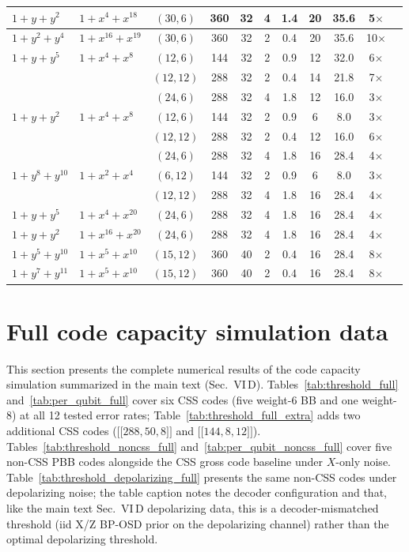\documentclass[aps,prxquantum,twocolumn,superscriptaddress,nofootinbib]{revtex4-2}
\newcommand{\dblbrk}[1]{\ensuremath{\lbrack\!\lbrack #1 \rbrack\!\rbrack}}
\newcommand{\code}[1]{\dblbrk{#1}}
\begin{document}
\begin{table}[t]
\begin{tabular}{llccccccccc}
\midrule
$1{+}y{+}y^{2}$ & $1{+}x^{4}{+}x^{18}$ & $(30,6)$ & 360 & 32 & 4 & 1.4 & 20 & 35.6 & 5$\times$ \\
\midrule
$1{+}y^{2}{+}y^{4}$ & $1{+}x^{16}{+}x^{19}$ & $(30,6)$ & 360 & 32 & 2 & 0.4 & 20 & 35.6 & 10$\times$ \\
\midrule
$1{+}y{+}y^{5}$ & $1{+}x^{4}{+}x^{8}$ & $(12,6)$ & 144 & 32 & 2 & 0.9 & 12 & 32.0 & 6$\times$ \\
 & & $(12,12)$ & 288 & 32 & 2 & 0.4 & 14 & 21.8 & 7$\times$ \\
 & & $(24,6)$ & 288 & 32 & 4 & 1.8 & 12 & 16.0 & 3$\times$ \\
\midrule
$1{+}y{+}y^{2}$ & $1{+}x^{4}{+}x^{8}$ & $(12,6)$ & 144 & 32 & 2 & 0.9 & 6 & 8.0 & 3$\times$ \\
 & & $(12,12)$ & 288 & 32 & 2 & 0.4 & 12 & 16.0 & 6$\times$ \\
 & & $(24,6)$ & 288 & 32 & 4 & 1.8 & 16 & 28.4 & 4$\times$ \\
\midrule
$1{+}y^{8}{+}y^{10}$ & $1{+}x^{2}{+}x^{4}$ & $(6,12)$ & 144 & 32 & 2 & 0.9 & 6 & 8.0 & 3$\times$ \\
 & & $(12,12)$ & 288 & 32 & 4 & 1.8 & 16 & 28.4 & 4$\times$ \\
\midrule
$1{+}y{+}y^{5}$ & $1{+}x^{4}{+}x^{20}$ & $(24,6)$ & 288 & 32 & 4 & 1.8 & 16 & 28.4 & 4$\times$ \\
\midrule
$1{+}y{+}y^{2}$ & $1{+}x^{16}{+}x^{20}$ & $(24,6)$ & 288 & 32 & 4 & 1.8 & 16 & 28.4 & 4$\times$ \\
\midrule
$1{+}y^{5}{+}y^{10}$ & $1{+}x^{5}{+}x^{10}$ & $(15,12)$ & 360 & 40 & 2 & 0.4 & 16 & 28.4 & 8$\times$ \\
\midrule
$1{+}y^{7}{+}y^{11}$ & $1{+}x^{5}{+}x^{10}$ & $(15,12)$ & 360 & 40 & 2 & 0.4 & 16 & 28.4 & 8$\times$ \\
\bottomrule
\end{tabular}
\end{table}

\section{Full code capacity simulation data}
\label{sm:threshold}

This section presents the complete numerical results of the code capacity simulation summarized in the main text (Sec.~VI\,D).
Tables~\ref{tab:threshold_full} and~\ref{tab:per_qubit_full} cover six CSS codes (five weight-6 BB and one weight-8) at all 12 tested error rates; Table~\ref{tab:threshold_full_extra} adds two additional CSS codes ($\code{288,50,8}$ and $\code{144,8,12}$).
Tables~\ref{tab:threshold_noncss_full} and~\ref{tab:per_qubit_noncss_full} cover five non-CSS PBB codes alongside the CSS gross code baseline under $X$-only noise.
Table~\ref{tab:threshold_depolarizing_full} presents the same non-CSS codes under depolarizing noise; the table caption notes the decoder configuration and that, like the main text Sec.~VI\,D depolarizing data, this is a decoder-mismatched threshold (iid X/Z BP-OSD prior on the depolarizing channel) rather than the optimal depolarizing threshold.
\end{document}
